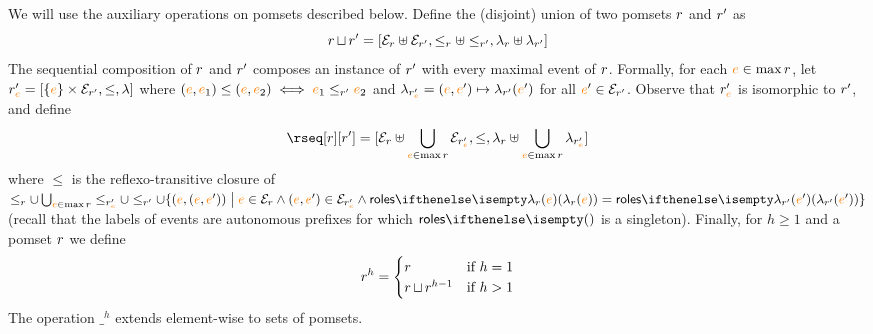 %
We will use the auxiliary operations on pomsets described below.
%
Define the (disjoint) union of two pomsets $r$ and $r'$ as
\[
  r \operatorname{\sqcup} r' =
  [\mathcal{E}_{r} \uplus \mathcal{E}_{r'},
  \leq_{r} \uplus \leq_{r'},
  \lambda_{r} \uplus \lambda_{r'}]
\]
The sequential composition of $r$ and $r'$ composes an
instance of $r'$ with every maximal event of $r$.
%
Formally, for each ${\color{orange}{e}} \in \max r$, let
$r'_{{\color{orange}{e}}} = [\{{\color{orange}{e}}\} \times \mathcal{E}_{r'}, \leq, \lambda]$ where
$({\color{orange}{e}},{\color{orange}{e}}_1) \leq ({\color{orange}{e}},{\color{orange}{e}}_2) \iff {\color{orange}{e}}_1 \leq_{r'} {\color{orange}{e}}_2$ and
$\lambda_{r'_{{\color{orange}{e}}}} = ({\color{orange}{e}},{\color{orange}{e}}') \mapsto \lambda_{r'}({\color{orange}{e}}')$ for
all ${\color{orange}{e}}' \in \mathcal{E}_{r'}$.
%
Observe that $r'_{{\color{orange}{e}}}$ is isomorphic to $r'$, and define
\[
  \rseq[\apom][\apom'] = 
  [\esetof{\apom} \uplus \bigcup_{\ae \in \max \apom}\esetof{\apom'_{\ae}},
  \leq,
  \alfof{\apom} \uplus \bigcup_{\ae \in \max \apom}\alfof{\apom'_{\ae}}]
\]
where $\leq$ is the reflexo-transitive closure of
$\leqof{\apom} \cup \bigcup_{\ae \in \max \apom}\leqof{\apom'_{\ae}}
\cup \leqof{\apom'} \cup \{(\ae,(\ae,\ae')) \sst \ae \in
\esetof{\apom} \land (\ae,\ae') \in \esetof{\apom'_{\ae}} \land
\roles{\alfof{\apom}(\ae)} = \roles{\alfof{\apom'}(\ae')}\}$ (recall
that the labels of events are autonomous prefixes for which
$\roles{}$ is a singleton).
%
%
Finally, for $h \geq 1$ and a pomset $r$ we define
\[
  r^h =
  \begin{cases}
    r & \text{if } h = 1
    \\
    r \operatorname{\sqcup} r^{h-1} & \text{if } h > 1
  \end{cases}
\]
The operation $\_^h$ extends element-wise to sets of pomsets.

